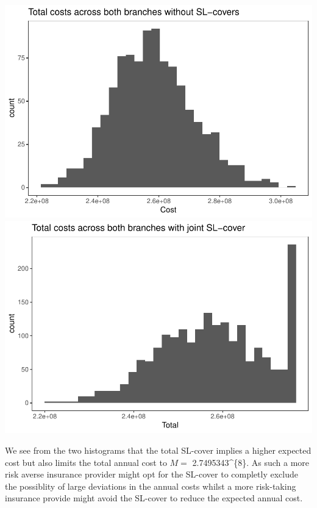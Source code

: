 \documentclass[]{article}
\begin{document}
\includegraphics{Projekt1_files/figure-latex/unnamed-chunk-18-1.pdf}
\includegraphics{Projekt1_files/figure-latex/unnamed-chunk-18-2.pdf}

We see from the two histograms that the total SL-cover implies a higher
expected cost but also limits the total annual cost to \(M =\)
2.7495343\^{}\{8\}. As such a more risk averse insurance
provider might opt for the SL-cover to completly exclude the possiblity
of large deviations in the annual costs whilst a more risk-taking
insurance provide might avoid the SL-cover to reduce the expected annual
cost.
\end{document}
